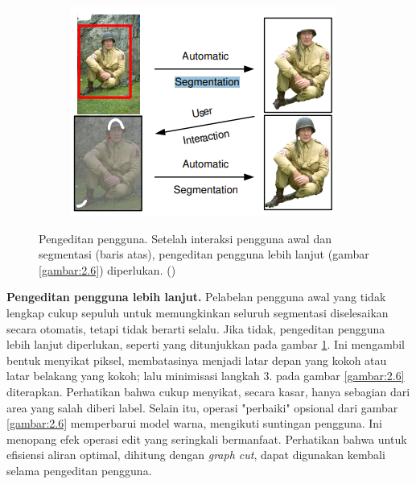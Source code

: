 \begin{figure}[H]
  \centering
    \begin{subfigure}{0.5\textwidth}
      \centering{}
      \includegraphics[width=\textwidth]{gambar/gambar-2_8.png}
    \end{subfigure}     
  \caption{
    Pengeditan pengguna. Setelah interaksi pengguna awal dan segmentasi (baris atas), 
    pengeditan pengguna lebih lanjut (gambar \ref{gambar:2.6}) diperlukan. (\cite{Rother:2004})
    }
    \label{gambar:2.8}
\end{figure}

\textbf{Pengeditan pengguna lebih lanjut.} Pelabelan pengguna awal yang tidak lengkap 
cukup sepuluh untuk memungkinkan seluruh segmentasi diselesaikan secara otomatis, 
tetapi tidak berarti selalu. Jika tidak, pengeditan pengguna lebih lanjut diperlukan, 
seperti yang ditunjukkan pada gambar \ref{gambar:2.8}. Ini mengambil bentuk menyikat piksel, membatasinya 
menjadi latar depan yang kokoh atau latar belakang yang kokoh; lalu minimisasi 
langkah 3. pada gambar \ref{gambar:2.6} diterapkan. Perhatikan bahwa cukup menyikat, secara 
kasar, hanya sebagian dari area yang salah diberi label. Selain itu, operasi "perbaiki" 
opsional dari gambar \ref{gambar:2.6} memperbarui model warna, mengikuti suntingan pengguna. Ini 
menopang efek operasi edit yang seringkali bermanfaat. Perhatikan bahwa untuk efisiensi 
aliran optimal, dihitung dengan \emph{graph cut}, dapat digunakan kembali selama 
pengeditan pengguna.

